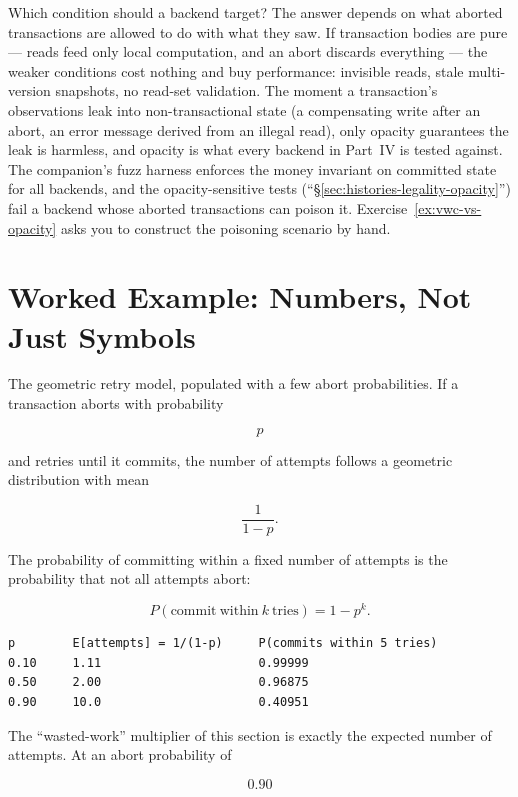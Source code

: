 Which condition should a backend target? The answer depends on what
aborted transactions are allowed to do with what they saw. If transaction
bodies are pure --- reads feed only local computation, and an abort
discards everything --- the weaker conditions cost nothing and buy
performance: invisible reads, stale multi-version snapshots, no
read-set validation. The moment a transaction's observations leak into
non-transactional state (a compensating write after an abort, an error
message derived from an illegal read), only opacity guarantees the leak
is harmless, and opacity is what every backend in Part~IV is tested
against. The companion's fuzz harness enforces the money invariant on
committed state for all backends, and the opacity-sensitive tests
(``\S\ref{sec:histories-legality-opacity}'') fail a backend whose aborted
transactions can poison it. Exercise~\ref{ex:vwc-vs-opacity} asks you to
construct the poisoning scenario by hand.

\section{Worked Example: Numbers, Not Just Symbols}
\label{sec:math-example}

The geometric retry model, populated with a few abort probabilities. If a
transaction aborts with probability

$$
p
$$

and retries until it commits, the number of attempts follows a geometric distribution with mean

$$
\frac{1}{1-p}.
$$

The probability of committing within a fixed number of attempts is the probability that not all attempts abort:

$$
P(\mathrm{commit\ within\ } k \mathrm{\ tries}) = 1 - p^k.
$$

\begin{lstlisting}[caption={The geometric retry model, numerically.}]
p        E[attempts] = 1/(1-p)     P(commits within 5 tries)
0.10     1.11                      0.99999
0.50     2.00                      0.96875
0.90     10.0                      0.40951
\end{lstlisting}

The ``wasted-work'' multiplier of this section is exactly the expected number of attempts. At an abort probability of

$$
0.90
$$

